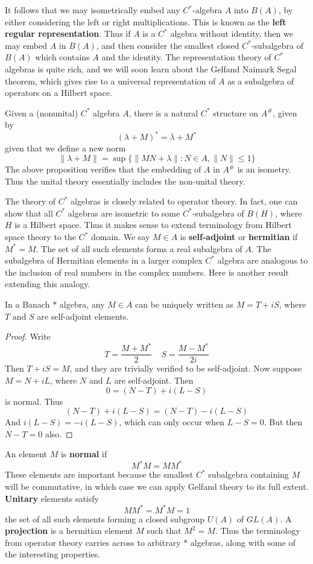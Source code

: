 It follows that we may isometrically embed any $C^*$-algebra $A$ into $B(A)$, by either considering the left or right multiplications. This is known as the {\bf left regular representation}. Thus if $A$ is a $C^*$ algebra without identity, then we may embed $A$ in $B(A)$, and then consider the smallest closed $C^*$-subalgebra of $B(A)$ which contains $A$ and the identity. The representation theory of $C^*$ algebras is quite rich, and we will soon learn about the Gelfand Naimark Segal theorem, which gives rise to a universal representation of $A$ as a subalgebra of operators on a Hilbert space.

Given a (nonunital) $C^*$ algebra $A$, there is a natural $C^*$ structure on $A^\#$, given by
%
\[ (\lambda + M)^* = \overline{\lambda} + M^* \]
%
given that we define a new norm
%
\[ \| \lambda + M \| = \sup \{ \| MN + \lambda \| : N \in A, \| N \| \leq 1 \} \]
%
The above proposition verifies that the embedding of $A$ in $A^\#$ is an isometry. Thus the unital theory essentially includes the non-unital theory.

The theory of $C^*$ algebras is closely related to operator theory. In fact, one can show that all $C^*$ algebras are isometric to some $C^*$-subalgebra of $B(H)$, where $H$ is a Hilbert space. Thus it makes sense to extend terminology from Hilbert space theory to the $C^*$ domain. We say $M \in A$ is {\bf self-adjoint} or {\bf hermitian} if $M^* = M$. The set of all such elements forms a real subalgebra of $A$. The subalgebra of Hermitian elements in a larger complex $C^*$ algebra are analogous to the inclusion of real numbers in the complex numbers. Here is another result extending this analogy.

\begin{prop}
    In a Banach $*$ algebra, any $M \in A$ can be uniquely written as $M = T + iS$, where $T$ and $S$ are self-adjoint elements.
\end{prop}
\begin{proof}
    Write
    \[ T = \frac{M + M^*}{2}\ \ \ \ \ S = \frac{M - M^*}{2i} \]
    Then $T + iS = M$, and they are trivially verified to be self-adjoint. Now suppose $M = N + iL$, where $N$ and $L$ are self-adjoint. Then
    \[ 0 = (N - T) + i(L - S) \]
    is normal. Thus
    \[ (N - T) + i(L - S) = (N - T) - i(L - S) \]
    And $i(L - S) = -i(L - S)$, which can only occur when $L - S = 0$. But then $N - T = 0$ also.
\end{proof}

An element $M$ is {\bf normal} if
%
\[ M^* M = MM^* \]
%
These elements are important because the smallest $C^*$ subalgebra containing $M$ will be commutative, in which case we can apply Gelfand theory to its full extent. {\bf Unitary} elements satisfy
%
\[ MM^* = M^*M = 1 \]
%
the set of all such elements forming a closed subgroup $U(A)$ of $GL(A)$. A {\bf projection} is a hermitian element $M$ such that $M^2 = M$. Thus the terminology from operator theory carries across to arbitrary $*$ algebras, along with some of the interesting properties.

